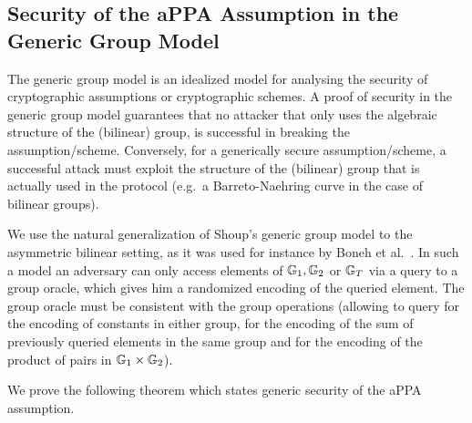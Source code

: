 \subsection{Security of the aPPA Assumption in the Generic Group Model}

The generic group model is an idealized model for analysing the security of cryptographic assumptions or cryptographic schemes. A proof of security in the generic group model guarantees that no attacker that only uses the algebraic structure of the (bilinear) group, is successful in breaking the assumption/scheme. Conversely, for a generically secure assumption/scheme, a successful attack must exploit the structure of the (bilinear) group that is actually used in the protocol (e.g.~a Barreto-Naehring curve in the case of bilinear groups).  

We use the natural generalization of Shoup's generic group model \cite{EC:Shoup97} to the asymmetric bilinear setting, as it was used for instance by Boneh et al.~\cite{EC:BonBoyGoh05}. In such a model an adversary can only access elements of $\mathbb{G}_1,\mathbb{G}_2$ or $\mathbb{G}_T$ via a query to a group oracle, which gives him a randomized  encoding of the queried element. The group oracle must be consistent with the group operations (allowing to query for the encoding of constants in either group, for the encoding of the sum of previously queried elements in the same group and for the encoding of the product of pairs in $\mathbb{G}_1\times \mathbb{G}_2$).

We prove the following theorem which states generic security of the aPPA assumption.

